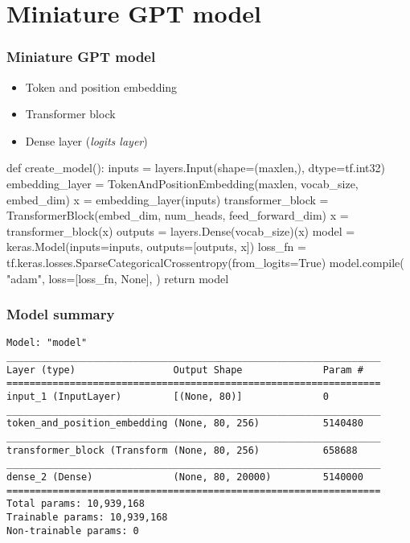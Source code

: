 \documentclass[17pt,institute=e10]{tuhh_presentation}
\begin{document}
\section{Miniature GPT model}

\begin{frame}[fragile]
  \frametitle{Miniature GPT model}
  \begin{itemize}
    \item Token and position embedding
    \item Transformer block
    \item Dense layer (\emph{logits layer})
  \end{itemize}
\vspace{1cm}
  \begin{python}
  def create_model():
    inputs = layers.Input(shape=(maxlen,), dtype=tf.int32)
    embedding_layer = TokenAndPositionEmbedding(maxlen, vocab_size, embed_dim)
    x = embedding_layer(inputs)
    transformer_block = TransformerBlock(embed_dim, num_heads, feed_forward_dim)
    x = transformer_block(x)
    outputs = layers.Dense(vocab_size)(x)
    model = keras.Model(inputs=inputs, outputs=[outputs, x])
    loss_fn = tf.keras.losses.SparseCategoricalCrossentropy(from_logits=True)
    model.compile(
        "adam", loss=[loss_fn, None],
    )  
    return model
  \end{python}
\end{frame}

\begin{frame}[fragile]
  \frametitle{Model summary}
\begin{lstlisting}[basicstyle=\small]
Model: "model"
_________________________________________________________________
Layer (type)                 Output Shape              Param #   
=================================================================
input_1 (InputLayer)         [(None, 80)]              0         
_________________________________________________________________
token_and_position_embedding (None, 80, 256)           5140480   
_________________________________________________________________
transformer_block (Transform (None, 80, 256)           658688    
_________________________________________________________________
dense_2 (Dense)              (None, 80, 20000)         5140000   
=================================================================
Total params: 10,939,168
Trainable params: 10,939,168
Non-trainable params: 0
\end{lstlisting}

\end{frame}
\end{document}
